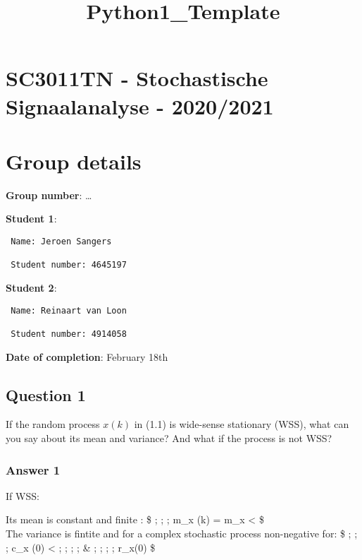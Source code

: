 \documentclass[11pt]{article}
\title{Python1\_Template}
\begin{document}
    
    \maketitle
    
    

    
    \hypertarget{sc3011tn---stochastische-signaalanalyse---20202021}{%
\section{SC3011TN - Stochastische Signaalanalyse -
2020/2021}\label{sc3011tn---stochastische-signaalanalyse---20202021}}

    \hypertarget{group-details}{%
\section{Group details}\label{group-details}}

\textbf{Group number}: \ldots{}

\textbf{Student 1}:

\begin{verbatim}
 Name: Jeroen Sangers
 
 Student number: 4645197
\end{verbatim}

\textbf{Student 2}:

\begin{verbatim}
 Name: Reinaart van Loon 
 
 Student number: 4914058
\end{verbatim}

\textbf{Date of completion}: February 18th

    \hypertarget{question-1}{%
\subsection{Question 1}\label{question-1}}

If the random process \(x(k)\) in (1.1) is wide-sense stationary (WSS),
what can you say about its mean and variance? And what if the process is
not WSS?

    \hypertarget{answer-1}{%
\subsubsection{Answer 1}\label{answer-1}}

If WSS:

Its mean is constant and finite : \$ ; ; ; m\_x (k) = m\_x \textless{}
\infty \$\\
The variance is fintite and for a complex stochastic process
non-negative for: \$ ; ; ; c\_x (0) \textless{} \infty  ; ; ; ; \& ; ; ;
; r\_x(0) \$\\
\end{document}
